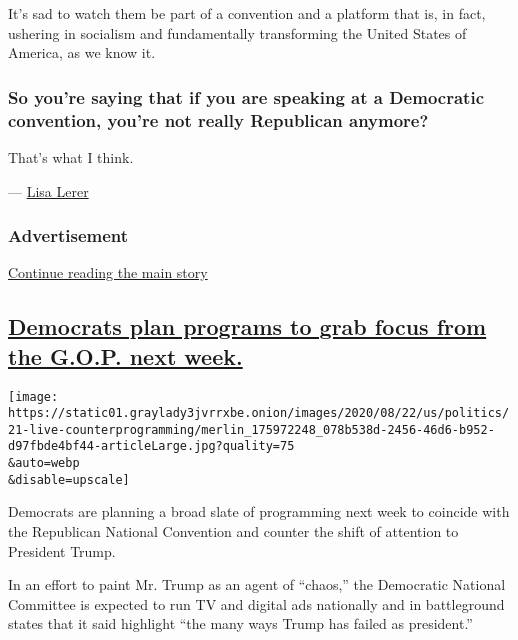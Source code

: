 It's sad to watch them be part of a convention and a platform that is,
in fact, ushering in socialism and fundamentally transforming the United
States of America, as we know it.

\hypertarget{so-youre-saying-that-if-you-are-speaking-at-a-democratic-convention-youre-not-really-republican-anymore}{%
\subsubsection{\texorpdfstring{\textbf{So you're saying that if you are
speaking at a Democratic convention, you're not really Republican
anymore?}}{So you're saying that if you are speaking at a Democratic convention, you're not really Republican anymore?}}\label{so-youre-saying-that-if-you-are-speaking-at-a-democratic-convention-youre-not-really-republican-anymore}}

That's what I think.

--- \href{https://www.nytimes3xbfgragh.onion/by/lisa-lerer}{Lisa Lerer}

\hypertarget{advertisement-2}{%
\subsubsection{Advertisement}\label{advertisement-2}}

\protect\hyperlink{after-dfp-ad-mid3}{Continue reading the main story}

\hypertarget{democrats-plan-programs-to-grab-focus-from-the-gop-next-week}{%
\subsection{\texorpdfstring{\protect\hyperlink{democrats-plan-programs-to-grab-focus-from-the-gop-next-week}{Democrats
plan programs to grab focus from the G.O.P. next
week.}}{Democrats plan programs to grab focus from the G.O.P. next week.}}\label{democrats-plan-programs-to-grab-focus-from-the-gop-next-week}}

\texttt{[image: https://static01.graylady3jvrrxbe.onion/images/2020/08/22/us/politics/21-live-counterprogramming/merlin\_175972248\_078b538d-2456-46d6-b952-d97fbde4bf44-articleLarge.jpg?quality=75\\\&auto=webp\\\&disable=upscale]}

Democrats are planning a broad slate of programming next week to
coincide with the Republican National Convention and counter the shift
of attention to President Trump.

In an effort to paint Mr. Trump as an agent of ``chaos,'' the Democratic
National Committee is expected to run TV and digital ads nationally and
in battleground states that it said highlight ``the many ways Trump has
failed as president.''

